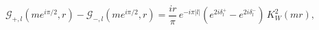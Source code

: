 \begin{equation}
\label{Eq_0221}
\mathcal{G}_{+,l}(me^{i\pi/2}, r) - \mathcal{G}_{-,l}(me^{i\pi/2},r)
  = \frac{ir}{\pi} \, e^{-i\pi|l|}
  (e^{2i\delta^{+}_l} - e^{2i\delta^{-}_l}) \, K^2_W(mr),
\end{equation}

